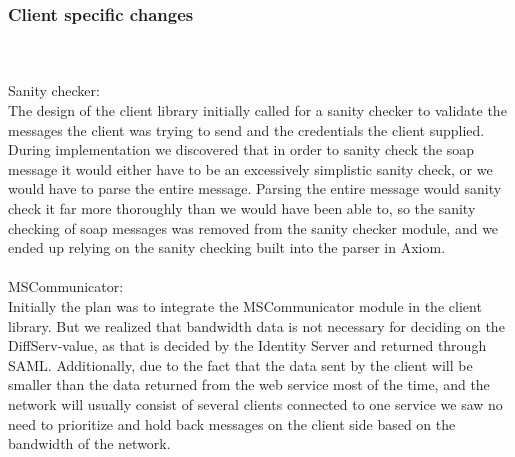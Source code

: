 \subsubsection{Client specific changes}\label{Changes:client}
 \\\\
Sanity checker:\\
The design of the client library initially called for a sanity checker to validate the messages the client was trying to send and the credentials the client supplied. During implementation we discovered that in order to sanity check the soap message it would either have to be an excessively simplistic sanity check, or we would have to parse the entire message. Parsing the entire message would sanity check it far more thoroughly than we would have been able to, so the sanity checking of soap messages was removed from the sanity checker module, and we ended up relying on the sanity checking built into the parser in Axiom.
\\\\
MSCommunicator:\\
Initially the plan was to integrate the MSCommunicator module in the client library. But we realized that bandwidth data is not necessary for deciding on the DiffServ-value, as that is decided by the Identity Server and returned through SAML.
Additionally, due to the fact that the data sent by the client will be smaller than the data returned from the web service most of the time, and the network will usually consist of several clients connected to one service we saw no need to prioritize and hold back messages on the client side based on the bandwidth of the network.

